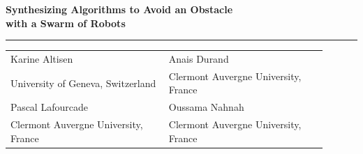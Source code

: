 \begin{frame}[plain]
  \vspace{0.8cm}

  {\LARGE\textbf{Synthesizing Algorithms to Avoid an Obstacle}\\[0.1cm]
  \textcolor{accent}{\LARGE\textbf{with a Swarm of Robots}}}

  \vspace{0.4cm}
  {\color{accent}\rule{1.8cm}{1.2pt}}

  \vfill
  \begin{tabular}{@{} >{\raggedright\arraybackslash}p{0.45\linewidth} >{\raggedright\arraybackslash}p{0.45\linewidth} @{}}
    Karine Altisen & Anais Durand \\
    \scriptsize University of Geneva, Switzerland & \scriptsize Clermont Auvergne University, France \\
    Pascal Lafourcade & Oussama Nahnah \\
    \scriptsize Clermont Auvergne University, France & \scriptsize Clermont Auvergne University, France
  \end{tabular}
\end{frame}
